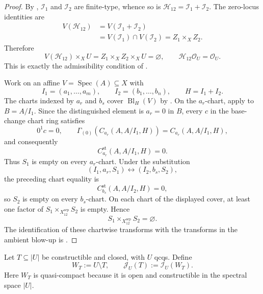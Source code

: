 \begin{proof}
  By ,
  $\mathcal I_1$ and $\mathcal I_2$ are finite-type, whence so is
  $\mathcal H_{12}=\mathcal I_1+\mathcal I_2$.  The zero-locus identities are
  \[
  \begin{aligned}
    V(\mathcal H_{12})
      &=V(\mathcal I_1+\mathcal I_2)\\
      &=V(\mathcal I_1)\cap V(\mathcal I_2)
       =Z_1\times_XZ_2.
  \end{aligned}
  \]
  Therefore
  \[
    V(\mathcal H_{12})\times_XU
      =Z_1\times_XZ_2\times_XU=\varnothing,
    \qquad
    \mathcal H_{12}\mathcal O_U=\mathcal O_U.
  \]
  This is exactly the admissibility condition of
  .

  Work on an affine $V=\operatorname{Spec}(A)\subseteq X$ with
  \[
    I_1=(a_1,\ldots,a_m),\qquad
    I_2=(b_1,\ldots,b_n),\qquad H=I_1+I_2.
  \]
  The charts indexed by $a_r$ and $b_s$ cover
  $\operatorname{Bl}_H(V)$ by
  .  On the $a_r$-chart, apply
   to $B=A/I_1$.  Since the
  distinguished element is $a_r=0$ in $B$, every $c$ in the base-change
  chart ring satisfies
  \[
    0^1c=0,\qquad
    \Gamma_{(0)}(C_{a_r}(A,A/I_1,H))=C_{a_r}(A,A/I_1,H),
  \]
  and consequently
  \[
    C_{a_r}^{\mathrm{st}}(A,A/I_1,H)=0.
  \]
  Thus $S_1$ is empty on every $a_r$-chart.  Under the substitution
  \[
    (I_1,a_r,S_1)\longleftrightarrow(I_2,b_s,S_2),
  \]
  the preceding chart equality is
  \[
    C_{b_s}^{\mathrm{st}}(A,A/I_2,H)=0,
  \]
  so $S_2$ is empty on every $b_s$-chart.  On each chart of the displayed
  cover, at least one factor of $S_1\times_{X^{\mathrm{sep}}_{12}}S_2$ is
  empty.  Hence
  \[
    S_1\times_{X^{\mathrm{sep}}_{12}}S_2=\varnothing.
  \]
  The identification of these chartwise transforms with the transforms in
  the ambient blow-up is
  .
\end{proof}

\begin{definition}
  \label{def:nagata-constructible-closed-support}

  Let $T\subseteq|U|$ be constructible and closed, with $U$ qcqs.  Define
  \[
    W_T:=U\setminus T,\qquad
    \mathcal J_U(T):=\mathcal I_U(W_T).
  \]
  Here $W_T$ is quasi-compact because it is open and constructible in the
  spectral space $|U|$.
\end{definition}

